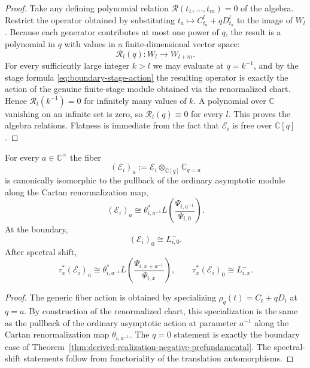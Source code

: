 \begin{proof}
Take any defining polynomial relation
$\mathscr R(t_1,\dots,t_m)=0$ of the algebra. Restrict the operator
obtained by substituting $t_a\mapsto C_{t_a}^l+qD_{t_a}^l$ to the image of
$W_l$. Because each generator contributes at most one power of $q$, the
result is a polynomial in $q$ with values in a finite-dimensional vector
space:
\begin{equation}
\mathscr R_l(q):W_l\longrightarrow W_{l+m}.
\end{equation}
For every sufficiently large integer $k>l$ we may evaluate at $q=k^{-1}$,
and by the stage formula \eqref{eq:boundary-stage-action} the resulting
operator is exactly the action of the genuine finite-stage module obtained
via the renormalized chart. Hence $\mathscr R_l(k^{-1})=0$ for infinitely
many values of $k$. A polynomial over $\mathbb C$ vanishing on an
infinite set is zero, so $\mathscr R_l(q)\equiv 0$ for every $l$. This
proves the algebra relations. Flatness is immediate from the fact that
$\mathcal E_i$ is free over $\mathbb C[q]$.
\end{proof}

\begin{theorem}
\ClaimStatusProvedHere
\label{thm:generic-and-boundary-fibers}
For every $a\in \mathbb C^\times$ the fiber
\begin{equation}
(\mathcal E_i)_a:=\mathcal E_i\otimes_{\mathbb C[q]}\mathbb C_{q=a}
\end{equation}
is canonically isomorphic to the pullback of the ordinary asymptotic
module along the Cartan renormalization map,
\begin{equation}
(\mathcal E_i)_a
\cong
\theta_{i,a^{-1}}^*L\!\left(\frac{\Psi_{i,a^{-1}}}{\Psi_{i,0}}\right).
\end{equation}
At the boundary,
\begin{equation}
(\mathcal E_i)_0\cong L^-_{i,0}.
\end{equation}
After spectral shift,
\begin{equation}
\tau_x^*(\mathcal E_i)_a
\cong
\theta_{i,a^{-1}}^*L\!\left(\frac{\Psi_{i,x+a^{-1}}}{\Psi_{i,x}}\right),
\qquad
\tau_x^*(\mathcal E_i)_0\cong L^-_{i,x}.
\end{equation}
\end{theorem}

\begin{proof}
The generic fiber action is obtained by specializing
$\rho_q(t)=C_t+qD_t$ at $q=a$. By construction of the renormalized chart,
this specialization is the same as the pullback of the ordinary
asymptotic action at parameter $a^{-1}$ along the Cartan renormalization
map $\theta_{i,a^{-1}}$. The $q=0$ statement is exactly the boundary case
of Theorem~\ref{thm:derived-realization-negative-prefundamental}. The
spectral-shift statements follow from functoriality of the translation
automorphisms.
\end{proof}


